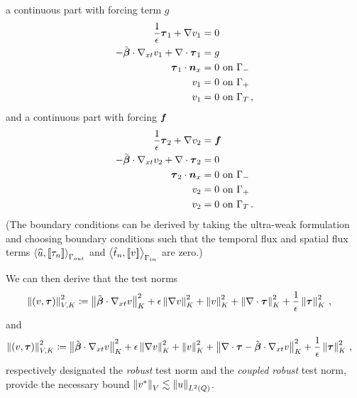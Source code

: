 \documentclass{article}
\theoremstyle{definition}
\theoremstyle{remark}
\begin{document}
a continuous part with forcing term $g$
\begin{align*}
\frac{1}{\epsilon}\boldsymbol\tau_1+\nabla v_1 &=0\\
-\tilde{\boldsymbol\beta}\cdot\nabla_{xt} v_1 + \nabla\cdot\boldsymbol\tau_1 &= g\\
\boldsymbol\tau_1\cdot\boldsymbol n_x &= 0 \text{ on } \Gamma_-\\
v_1 &= 0 \text{ on } \Gamma_+\\
v_1 &= 0 \text{ on } \Gamma_T\,,
\end{align*}
and a continuous part with forcing $\boldsymbol f$
\begin{align*}
\frac{1}{\epsilon}\boldsymbol\tau_2+\nabla v_2 &=\boldsymbol f\\
-\tilde{\boldsymbol\beta}\cdot\nabla_{xt} v_2 + \nabla\cdot\boldsymbol\tau_2 &= 0\\
\boldsymbol\tau_2\cdot\boldsymbol n_x &= 0 \text{ on } \Gamma_-\\
v_2 &= 0 \text{ on } \Gamma_+\\
v_2 &= 0 \text{ on } \Gamma_T\,.
\end{align*}
(The boundary conditions can be derived by taking the ultra-weak formulation and choosing boundary conditions such that the temporal flux and spatial flux terms $\left\langle \widehat{u}, \left[ \![\tau_n]\! \right] \right\rangle_{\Gamma_{out}}$ and $\left\langle \hat t_n,\left[ \![v]\! \right] \right\rangle_{\Gamma_{in}}$ are zero.)

We can then derive that the test norms
\begin{align}
\label{eq:robustnorm}
\left\| \left( v,\boldsymbol\tau \right) \right\|_{V,K}^2 &\coloneqq
\left\| \tilde{\boldsymbol\beta}\cdot\nabla_{xt} v \right\|_K^2
+ \epsilon\left\| \nabla v \right\|_K^2
+ \left\| v \right\|^2_K
+ \left\| \nabla\cdot \boldsymbol\tau \right\|_K^2
+ \frac{1}{\epsilon}\left\| \boldsymbol\tau \right\|_K^2\,,
\end{align}
and
\begin{align}
\label{eq:coupledrobustnorm}
\left\| \left( v,\boldsymbol\tau \right) \right\|_{V,K}^2 &\coloneqq
\left\| \tilde{\boldsymbol\beta}\cdot\nabla_{xt} v \right\|_K^2
+ \epsilon\left\| \nabla v \right\|_K^2
+ \left\| v \right\|^2_K
+ \left\| \nabla\cdot \boldsymbol\tau - \tilde{\boldsymbol\beta}\cdot\nabla_{xt} v \right\|_K^2
+ \frac{1}{\epsilon}\left\| \boldsymbol\tau \right\|_K^2\,,
\end{align}
respectively designated the \emph{robust} test norm and the \emph{coupled robust} test norm,
provide the necessary bound $\left\| v^* \right\|_V \lesssim \left\| u \right\|_{L^2\left( Q \right)}$.
\end{document}
